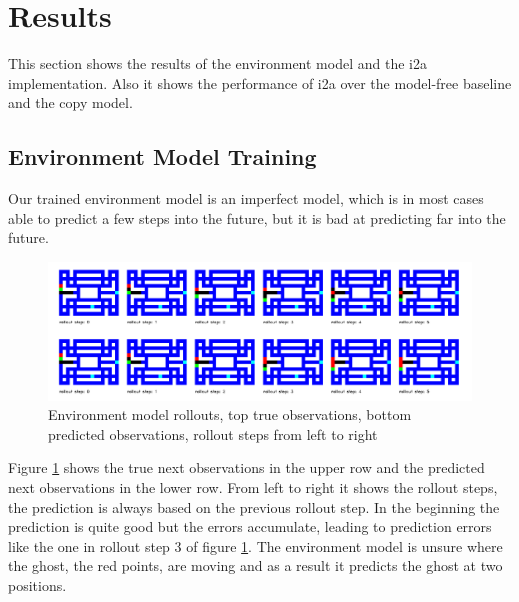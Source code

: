 \section{Results}

This section shows the results of the environment model and the i2a implementation. Also it shows the performance of i2a over the model-free baseline and the copy model.


\subsection{Environment Model Training}

Our trained environment model is an imperfect model, which is in most cases able to predict a few steps into the future, but it is bad at predicting far into the future.\\





\begin{figure}[H] 
  \centering   
  \includegraphics[width=\columnwidth]{./Images/env_model_rollouts.png}
  \caption{Environment model rollouts, top true observations, bottom predicted observations, rollout steps from left to right} 
  \label{fig:environment_model_rollouts} 
\end{figure} 



Figure \ref{fig:environment_model_rollouts} shows the true next observations in the upper row and the predicted next observations in the lower row. From left to right it shows the rollout steps, the prediction is always based on the previous rollout step. In the beginning the prediction is quite good but the errors accumulate, leading to prediction errors like the one in rollout step 3 of figure \ref{fig:environment_model_rollouts}. The environment model is unsure where the ghost, the red points, are moving and as a result it predicts the ghost at two positions.\\



